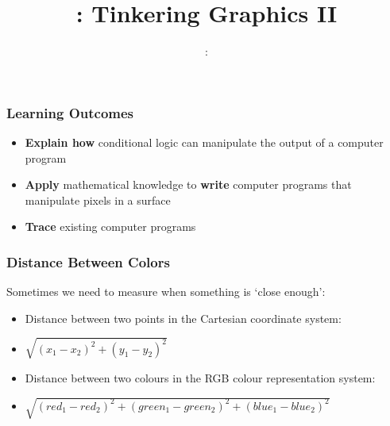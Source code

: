 \usepackage{../../beamerthemeFalmouthGamesAcademy}
\usepackage{multimedia}
\graphicspath{ {../../} }


\usepackage[normalem]{ulem}
\usepackage{wasysym}

\usepackage{pdfpages}

\usetikzlibrary{arrows,automata}





\title{\sessionnumber: Tinkering Graphics II}
\subtitle{\modulecode: \moduletitle}

\frame{\titlepage} 

\begin{frame}
	\frametitle{Learning Outcomes}
	\begin{itemize}
		\item \textbf{Explain how} conditional logic can manipulate the output of a computer program
		\item \textbf{Apply} mathematical knowledge to \textbf{write} computer programs that manipulate pixels in a surface
		\item \textbf{Trace} existing computer programs
	\end{itemize}
\end{frame}

\begin{frame}
	\frametitle{Distance Between Colors}
	
	Sometimes we need to measure when something is `close enough':
	
	\begin{itemize}		
		\item Distance between two points in the Cartesian coordinate system:
		\item $\sqrt{(x_{1} - x_{2})^2 + (y_{1} - y_{2})^2}$
		\item Distance between two colours in the RGB colour representation system:
		\item $\sqrt{(red_{1} - red_{2})^2 + (green_{1} - green_{2})^2 + (blue_{1} - blue_{2})^2}$
	\end{itemize}
\end{frame}

